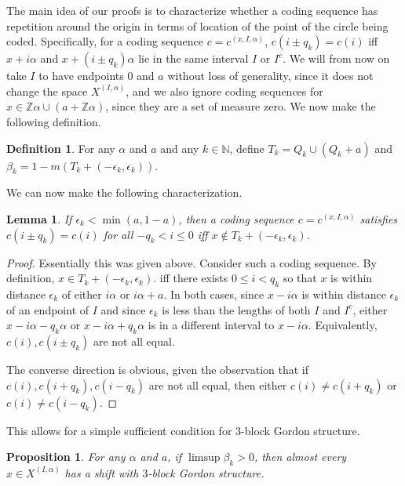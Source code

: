 \documentclass[11pt,reqno]{amsart}
\newtheorem{lemma}[theorem]{Lemma}
\newtheorem{proposition}[theorem]{Proposition}
\theoremstyle{definition}
\newtheorem{definition}[theorem]{Definition}
\theoremstyle{plain}
\begin{document}
The main idea of our proofs is to characterize whether a coding sequence has repetition around the origin in terms of location of the point of the circle being coded. 
Specifically, for a coding sequence $c = c^{(x,I,\alpha)}$, $c(i \pm q_k) = c(i)$ iff $x + i\alpha$ and 
$x + (i \pm q_k) \alpha$ lie in the same interval $I$ or $I^c$. We will from now on take $I$ to have endpoints $0$ and $a$ without loss of generality, since it does not change the space $X^{(I,\alpha)}$, and we also ignore coding sequences for $x \in \mathbb{Z}\alpha \cup (a + \mathbb{Z}\alpha)$, since they are a set of measure zero. We now make the following definition.

\begin{definition}
For any $\alpha$ and $a$ and any $k \in \mathbb{N}$, define $T_k = Q_k \cup (Q_k + a)$ and
$\beta_k = 1 - m(T_k + (-\epsilon_k, \epsilon_k))$.
\end{definition}

We can now make the following characterization.

\begin{lemma}\label{Tk}
If $\epsilon_k < \min(a, 1-a)$, then a coding sequence $c = c^{(x,I,\alpha)}$ satisfies $c(i \pm q_k) = c(i)$ for all $-q_k < i \leq 0$ iff $x \notin T_k + (-\epsilon_k, \epsilon_k)$.    
\end{lemma}

\begin{proof}
Essentially this was given above. Consider such a coding sequence. By definition, $x \in T_k + (-\epsilon_k, \epsilon_k)$. iff there exists $0 \leq i < q_k$ so that $x$ is within distance $\epsilon_k$ of either $i\alpha$ or $i\alpha + a$. In both cases, since $x - i\alpha$ is within distance $\epsilon_k$ of an endpoint of $I$ and since $\epsilon_k$ is less than the lengths of both $I$ and $I^c$, either $x - i\alpha - q_k \alpha$ or $x - i\alpha + q_k \alpha$ is in a different interval to $x - i\alpha$. Equivalently, $c(i), c(i \pm q_k)$ are not all equal.

The converse direction is obvious, given the observation that if $c(i), c(i + q_k), c(i - q_k)$ are not all equal, then either $c(i) \neq c(i + q_k)$ or $c(i) \neq c(i - q_k)$.

\end{proof}

This allows for a simple sufficient condition for $3$-block Gordon structure.

\begin{proposition}\label{longint}
For any $\alpha$ and $a$, if $\limsup \beta_k > 0$, then almost every $x \in X^{(I, \alpha)}$ has a shift with $3$-block Gordon structure.
\end{proposition}
\end{document}
